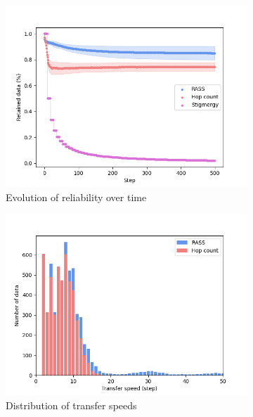 \documentclass[sigconf]{aamas}
\begin{document}
\begin{figure}
    \centering
    \begin{subfigure}{0.30\textwidth}
        \includegraphics[width=\textwidth]{figures/scale_reliability.png}
        \caption{Evolution of reliability over time}
        \label{results:scale_100_reliability}
    \end{subfigure}
    \begin{subfigure}{0.30\textwidth}
        \includegraphics[width=\textwidth]{figures/scale_speed.png}
        \caption{Distribution of transfer speeds}
        \label{results:scale_100_speed}
    \end{subfigure}
    \begin{subfigure}{0.30\textwidth}

\end{subfigure}
\end{figure}
\end{document}
